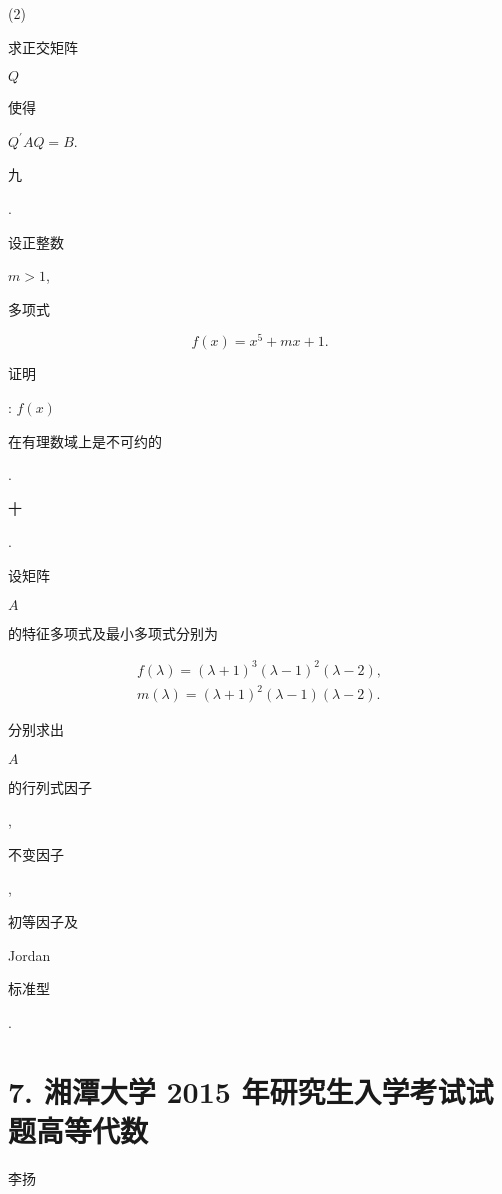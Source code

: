 \documentclass[10pt]{article}
\begin{document}
(2) \begin{CJK}{UTF8}{mj}求正交矩阵\end{CJK} $Q$ \begin{CJK}{UTF8}{mj}使得\end{CJK} $Q^{\prime} A Q=B$.

\begin{CJK}{UTF8}{mj}九\end{CJK}. \begin{CJK}{UTF8}{mj}设正整数\end{CJK} $m>1$, \begin{CJK}{UTF8}{mj}多项式\end{CJK}
$$
f(x)=x^{5}+m x+1 .
$$
\begin{CJK}{UTF8}{mj}证明\end{CJK}: $f(x)$ \begin{CJK}{UTF8}{mj}在有理数域上是不可约的\end{CJK}.

\begin{CJK}{UTF8}{mj}十\end{CJK}. \begin{CJK}{UTF8}{mj}设矩阵\end{CJK} $A$ \begin{CJK}{UTF8}{mj}的特征多项式及最小多项式分别为\end{CJK}
$$
\begin{array}{r}
f(\lambda)=(\lambda+1)^{3}(\lambda-1)^{2}(\lambda-2), \\
m(\lambda)=(\lambda+1)^{2}(\lambda-1)(\lambda-2) .
\end{array}
$$
\begin{CJK}{UTF8}{mj}分别求出\end{CJK} $A$ \begin{CJK}{UTF8}{mj}的行列式因子\end{CJK}, \begin{CJK}{UTF8}{mj}不变因子\end{CJK}, \begin{CJK}{UTF8}{mj}初等因子及\end{CJK} Jordan \begin{CJK}{UTF8}{mj}标准型\end{CJK}.

\section{7. 湘潭大学 2015 年研究生入学考试试题高等代数}
\begin{CJK}{UTF8}{mj}李扬\end{CJK}
\end{document}
